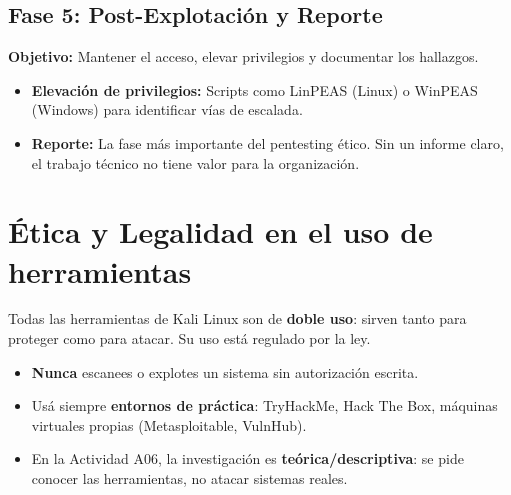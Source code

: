 \documentclass[11pt,a4paper]{article}
\begin{document}
\subsection{Fase 5: Post-Explotación y Reporte}
\textbf{Objetivo:} Mantener el acceso, elevar privilegios y documentar los hallazgos.

\begin{itemize}[leftmargin=*]
  \item \textbf{Elevación de privilegios:} Scripts como LinPEAS (Linux) o WinPEAS (Windows) para identificar vías de escalada.
  \item \textbf{Reporte:} La fase más importante del pentesting ético. Sin un informe claro, el trabajo técnico no tiene valor para la organización.
\end{itemize}

\section{Ética y Legalidad en el uso de herramientas}

\begin{alerta}[¡Fundamental!]
Todas las herramientas de Kali Linux son de \textbf{doble uso}: sirven tanto para proteger como para atacar. Su uso está regulado por la ley.
\begin{itemize}[leftmargin=*]
  \item \textbf{Nunca} escanees o explotes un sistema sin autorización escrita.
  \item Usá siempre \textbf{entornos de práctica}: TryHackMe, Hack The Box, máquinas virtuales propias (Metasploitable, VulnHub).
  \item En la Actividad A06, la investigación es \textbf{teórica/descriptiva}: se pide conocer las herramientas, no atacar sistemas reales.
\end{itemize}
\end{alerta}

\end{document}
